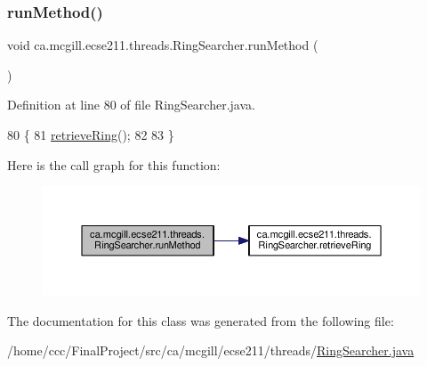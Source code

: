 \subsubsection{\texorpdfstring{run\+Method()}{runMethod()}}
{\footnotesize\ttfamily void ca.\+mcgill.\+ecse211.\+threads.\+Ring\+Searcher.\+run\+Method (\begin{DoxyParamCaption}{ }\end{DoxyParamCaption})\hspace{0.3cm}{\ttfamily [protected]}}



Definition at line 80 of file Ring\+Searcher.\+java.


\begin{DoxyCode}
80                              \{
81     \hyperlink{classca_1_1mcgill_1_1ecse211_1_1threads_1_1_ring_searcher_abd7a2651a7c5de76a018664c8bf327af}{retrieveRing}();
82 
83   \}
\end{DoxyCode}
Here is the call graph for this function\+:
\nopagebreak
\begin{figure}[H]
\begin{center}
\leavevmode
\includegraphics[width=350pt]{classca_1_1mcgill_1_1ecse211_1_1threads_1_1_ring_searcher_a2b03c700b5d232f5aef7c6acf439b7ea_cgraph}
\end{center}
\end{figure}


The documentation for this class was generated from the following file\+:\begin{DoxyCompactItemize}
\item 
/home/ccc/\+Final\+Project/src/ca/mcgill/ecse211/threads/\hyperlink{_ring_searcher_8java}{Ring\+Searcher.\+java}\end{DoxyCompactItemize}
